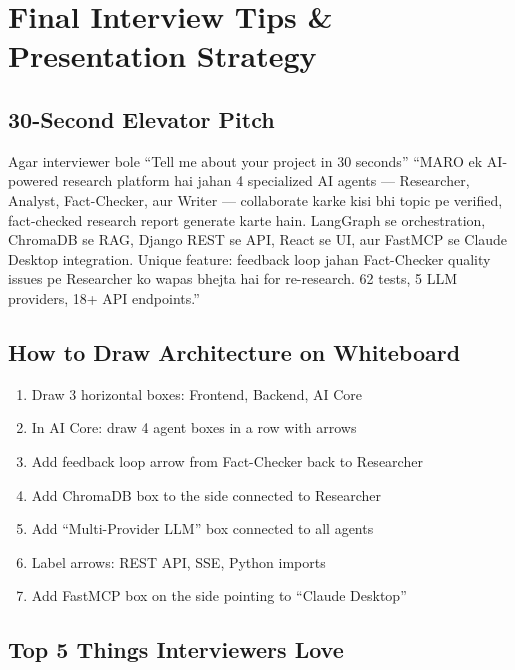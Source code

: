 \documentclass[11pt,a4paper,twoside]{report}
\begin{document}

\chapter{Final Interview Tips \& Presentation Strategy}

\section{30-Second Elevator Pitch}

\begin{storybox}{Agar interviewer bole ``Tell me about your project in 30 seconds''}
``MARO ek AI-powered research platform hai jahan 4 specialized AI agents --- Researcher, Analyst, Fact-Checker, aur Writer --- collaborate karke kisi bhi topic pe verified, fact-checked research report generate karte hain. LangGraph se orchestration, ChromaDB se RAG, Django REST se API, React se UI, aur FastMCP se Claude Desktop integration. Unique feature: feedback loop jahan Fact-Checker quality issues pe Researcher ko wapas bhejta hai for re-research. 62 tests, 5 LLM providers, 18+ API endpoints.''
\end{storybox}

\section{How to Draw Architecture on Whiteboard}

\begin{enumerate}
    \item Draw 3 horizontal boxes: Frontend, Backend, AI Core
    \item In AI Core: draw 4 agent boxes in a row with arrows
    \item Add feedback loop arrow from Fact-Checker back to Researcher
    \item Add ChromaDB box to the side connected to Researcher
    \item Add ``Multi-Provider LLM'' box connected to all agents
    \item Label arrows: REST API, SSE, Python imports
    \item Add FastMCP box on the side pointing to ``Claude Desktop''
\end{enumerate}

\section{Top 5 Things Interviewers Love}
\end{document}
